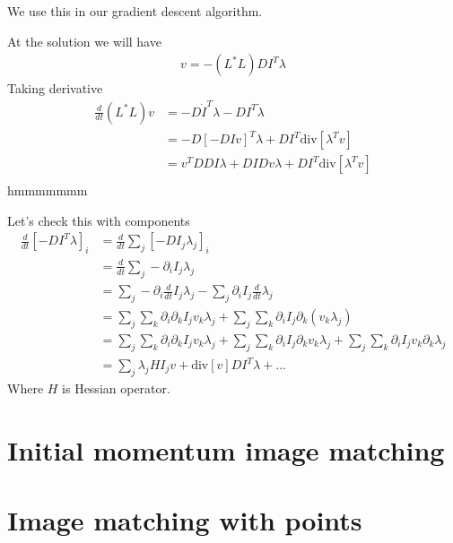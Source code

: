 \documentclass{article}
\begin{document}
We use this in our gradient descent algorithm.

At the solution we will have
\begin{align*}
v = -(L^*L) DI^T \lambda
\end{align*}
Taking derivative
\begin{align*}
\frac{d}{dt}(L^*L)v &= -D\dot I^T \lambda - DI^T\dot \lambda\\
&=-D[-DI v]^T\lambda + DI^T \text{div}[\lambda^T v]\\
&=v^T DDI \lambda + DI Dv \lambda + DI^T \text{div}[\lambda^T v]\\
\end{align*}
hmmmmmmm

Let's check this with components
\begin{align*}
\frac{d}{dt} [-DI^T \lambda]_i &= \frac{d}{dt} \sum_j [-DI_j \lambda_j]_i\\
&= \frac{d}{dt} \sum_j -\partial_i I_j \lambda_j\\
&=  \sum_j -\partial_i \frac{d}{dt}I_j \lambda_j -\sum_j \partial_i I_j \frac{d}{dt}\lambda_j\\
&=  \sum_j\sum_k \partial_i \partial_k I_j v_k \lambda_j + \sum_j \sum_k \partial_i I_j \partial_k (v_k \lambda_j) \\
&=  \sum_j\sum_k \partial_i \partial_k I_j v_k \lambda_j + \sum_j \sum_k \partial_i I_j \partial_k v_k \lambda_j + \sum_j \sum_k \partial_i I_j  v_k \partial_k \lambda_j  \\
&=  \sum_j \lambda_j H I_j v + \text{div}[v] DI^T \lambda + ...
\end{align*}
Where $H$ is Hessian operator.

\section{Initial momentum image matching}

\section{Image matching with points}
\end{document}

